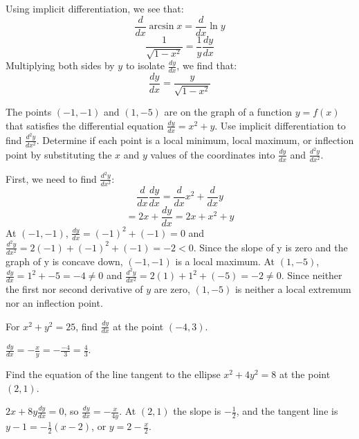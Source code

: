 \begin{Answer}[ref=implicit1]
	Using implicit differentiation, we see that:
	$$\frac{d}{dx}\arcsin{x} = \frac{d}{dx}\ln{y}$$
	$$\frac{1}{\sqrt{1-x^2}} = \frac{1}{y}\frac{dy}{dx}$$
	Multiplying both sides by $y$ to isolate $\frac{dy}{dx}$, we find that:
	$$\frac{dy}{dx} = \frac{y}{\sqrt{1-x^2}}$$
\end{Answer}

\begin{Exercise} The points 
	$(-1, -1)$ and $(1, -5)$ are on the graph of a function $y = f(x)$ 
	that satisfies the differential equation $\frac{dy}{dx} = x^2 + y$. 
	Use implicit differentiation to find $\frac{d^2y}{dx^2}$. Determine 
	if each point is a local minimum, local maximum, or inflection point 
	by substituting the $x$ and $y$ values of the coordinates into 
	$\frac{dy}{dx}$ and $\frac{d^2y}{dx^2}$. 
\end{Exercise}

\begin{Answer}[ref=implicit2]
	First, we need to find $\frac{d^2y}{dx^2}$:
	$$\frac{d}{dx}\frac{dy}{dx} = \frac{d}{dx}x^2 + \frac{d}{dx}y$$
	$$= 2x + \frac{dy}{dx} = 2x + x^2 + y$$
	At $(-1,-1)$, $\frac{dy}{dx} = (-1)^2 + (-1) = 0$ and 
	$\frac{d^2y}{dx^2} = 2(-1) + (-1)^2 + (-1) = -2 < 0$. Since the 
	slope of y is zero and the graph of y is concave down, $(-1,-1)$ is a 
	local maximum. At $(1, -5)$, $\frac{dy}{dx} = 1^2 + -5 = -4 \neq 0$ 
	and $\frac{d^2y}{dx^2} = 2(1) + 1^2 + (-5) = -2 \neq 0$. Since 
	neither the first nor second derivative of $y$ are zero, $(1, -5)$ 
	is neither a local extremum nor an inflection point. 
\end{Answer}

\begin{Exercise}[title={Slope on a Circle}, label=implicit3]
For $x^2 + y^2 = 25$, find $\frac{dy}{dx}$ at the point $(-4, 3)$.
\end{Exercise}
\begin{Answer}[ref=implicit3]
$\frac{dy}{dx} = -\frac{x}{y} = -\frac{-4}{3} = \frac{4}{3}$.
\end{Answer}

\begin{Exercise}[title={Tangent to an Ellipse}, label=implicit4]
Find the equation of the line tangent to the ellipse $x^2 + 4y^2 = 8$ at
the point $(2, 1)$.
\end{Exercise}
\begin{Answer}[ref=implicit4]
$2x + 8y\frac{dy}{dx} = 0$, so $\frac{dy}{dx} = -\frac{x}{4y}$. At $(2, 1)$
the slope is $-\frac{1}{2}$, and the tangent line is $y - 1 =
-\frac{1}{2}(x - 2)$, or $y = 2 - \frac{x}{2}$.
\end{Answer}

